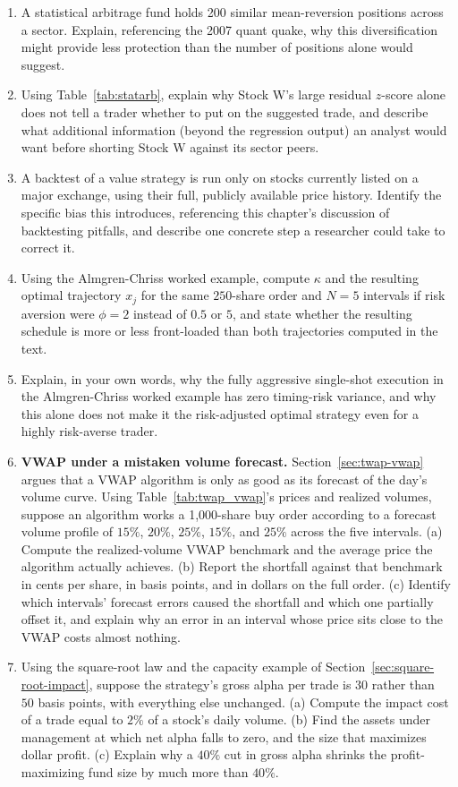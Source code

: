 \documentclass[../ai_in_finance]{subfiles}
\begin{document}
\begin{enumerate}[exercises]
    \item A statistical arbitrage fund holds 200 similar mean-reversion positions across a sector. Explain, referencing the 2007 quant quake, why this diversification might provide less protection than the number of positions alone would suggest.
    \item Using Table~\ref{tab:statarb}, explain why Stock W's large residual $z$-score alone does not tell a trader whether to put on the suggested trade, and describe what additional information (beyond the regression output) an analyst would want before shorting Stock W against its sector peers.
    \item A backtest of a value strategy is run only on stocks currently listed on a major exchange, using their full, publicly available price history. Identify the specific bias this introduces, referencing this chapter's discussion of backtesting pitfalls, and describe one concrete step a researcher could take to correct it.
    \item Using the Almgren-Chriss worked example, compute $\kappa$ and the resulting optimal trajectory $x_j$ for the same $250$-share order and $N=5$ intervals if risk aversion were $\phi=2$ instead of $0.5$ or $5$, and state whether the resulting schedule is more or less front-loaded than both trajectories computed in the text.
    \item Explain, in your own words, why the fully aggressive single-shot execution in the Almgren-Chriss worked example has zero timing-risk variance, and why this alone does not make it the risk-adjusted optimal strategy even for a highly risk-averse trader.
    \item \textbf{VWAP under a mistaken volume forecast.} Section~\ref{sec:twap-vwap} argues that a VWAP algorithm is only as good as its forecast of the day's volume curve. Using Table~\ref{tab:twap_vwap}'s prices and realized volumes, suppose an algorithm works a 1,000-share buy order according to a forecast volume profile of $15\%$, $20\%$, $25\%$, $15\%$, and $25\%$ across the five intervals. (a) Compute the realized-volume VWAP benchmark and the average price the algorithm actually achieves. (b) Report the shortfall against that benchmark in cents per share, in basis points, and in dollars on the full order. (c) Identify which intervals' forecast errors caused the shortfall and which one partially offset it, and explain why an error in an interval whose price sits close to the VWAP costs almost nothing.
    \item Using the square-root law and the capacity example of Section~\ref{sec:square-root-impact}, suppose the strategy's gross alpha per trade is $30$ rather than $50$ basis points, with everything else unchanged. (a) Compute the impact cost of a trade equal to $2\%$ of a stock's daily volume. (b) Find the assets under management at which net alpha falls to zero, and the size that maximizes dollar profit. (c) Explain why a $40\%$ cut in gross alpha shrinks the profit-maximizing fund size by much more than $40\%$.

\end{enumerate}
\end{document}

